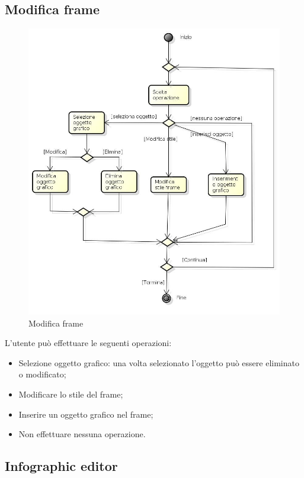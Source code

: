 \subsection{Modifica frame}

\begin{figure}[h!]
		\centering
		\includegraphics[scale=.2]{img/Modifica_frame.jpg}
		\caption{Modifica frame}
		\label{fig:ModelloSpy}
\end{figure}

L'utente può effettuare le seguenti operazioni:
\begin{itemize}
\item Selezione oggetto grafico: una volta selezionato l'oggetto può essere eliminato o modificato;
\item Modificare lo stile del frame;
\item Inserire un oggetto grafico nel frame;
\item Non effettuare nessuna operazione.
\end{itemize}

\subsection{Infographic editor}

